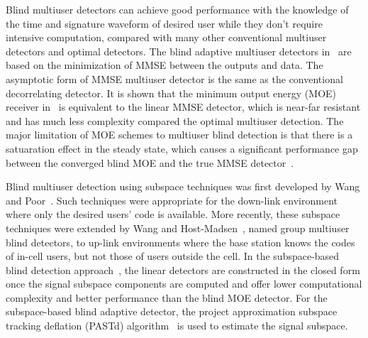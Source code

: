 \documentclass[a4paper,11pt,fleqn]{article}
\begin{document}
Blind multiuser detectors can achieve good performance with the
knowledge of the time and signature waveform of desired user while
they don't require intensive computation, compared with many other
conventional multiuser detectors and optimal detectors. The blind
adaptive multiuser detectors in~\cite{Madh94,Honi95} are based on
the minimization of MMSE between the outputs and data. The
asymptotic form of MMSE multiuser detector is the same as the
conventional decorrelating detector. It is shown that the minimum
output energy (MOE) receiver in~\cite{Honi95} is equivalent to the
linear MMSE detector, which is near-far resistant and has much
less complexity compared the optimal multiuser detection. The
major limitation of MOE schemes to multiuser blind detection is
that there is a satuaration effect in the steady state, which
causes a significant performance gap between the converged blind
MOE and the true MMSE detector~\cite{Honi95}.

Blind multiuser detection using subspace techniques was first
developed by Wang and Poor~\cite{Wang98, Poor98}. Such techniques
were appropriate for the down-link environment where only the
desired users' code is available. More recently, these subspace
techniques were extended by Wang and Host-Madsen~\cite{Wang99},
named group multiuser blind detectors, to up-link environments
where the base station knows the codes of in-cell users, but not
those of users outside the cell. In the subspace-based blind
detection approach~\cite{Wang98}, the linear detectors are
constructed in the closed form once the signal subspace components
are computed and offer lower computational complexity and better
performance than the blind MOE detector. For the subspace-based
blind adaptive detector, the project approximation subspace
tracking deflation (PASTd) algorithm~\cite{Yang95} is used to
estimate the signal subspace.
\end{document}
